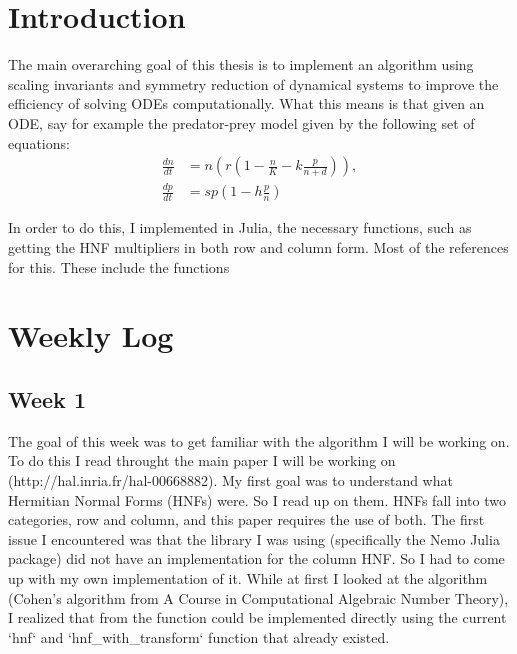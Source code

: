\documentclass[oneside, a4paper, onecolumn, 11pt]{article}
\begin{document}
\newpage
\tableofcontents
\newpage


\section{Introduction}

The main overarching goal of this thesis is to implement an algorithm using scaling invariants and symmetry reduction of dynamical systems to improve the efficiency of solving ODEs computationally. What this means is that given an ODE, say for example the predator-prey model given by the following set of equations:
\begin{align*}
    \frac{dn}{dt}
     & = n (r (1 - \frac{n}{K} - k \frac{p}{n + d})), \\
    \frac{dp}{dt}
     & = sp (1 - h \frac{p}{n})
\end{align*}

In order to do this, I implemented in Julia, the necessary functions, such as getting the HNF multipliers in both row and column form. Most of the references for this. These include the functions \cite{Hubert2013}

\section{Weekly Log}

\subsection{Week 1}

The goal of this week was to get familiar with the algorithm I will be working on. To do this I read throught the main paper I will be working on (http://hal.inria.fr/hal-00668882). My first goal was to understand what Hermitian Normal Forms (HNFs) were. So I read up on them. HNFs fall into two categories, row and column, and this paper requires the use of both. The first issue I encountered was that the library I was using (specifically the Nemo Julia package) did not have an implementation for the column HNF. So I had to come up with my own implementation of it. While at first I looked at the algorithm (Cohen's algorithm from A Course in Computational Algebraic Number Theory), I realized that from the function could be implemented directly using the current `hnf` and `hnf\_with\_transform` function that already existed.

\newpage
\end{document}
